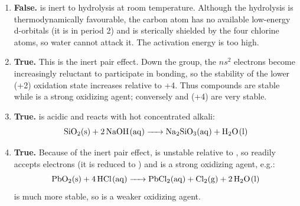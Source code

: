 \documentclass[11pt]{article}
\newcommand{\cle}[1]{{\popxbold\color{popdark}#1}}
\begin{document}
\begin{corrige}
\begin{enumerate}
\item \textbf{False.}  is inert to hydrolysis at room temperature. Although the hydrolysis is thermodynamically favourable, the carbon atom has no available low-energy d-orbitals (it is in period 2) and is sterically shielded by the four chlorine atoms, so water cannot attack it. The activation energy is too high.

\item \textbf{True.} This is the \cle{inert pair effect}. Down the group, the $ns^2$ electrons become increasingly reluctant to participate in bonding, so the stability of the lower (+2) oxidation state increases relative to +4. Thus  compounds are stable while  is a strong oxidizing agent; conversely  and  (+4) are very stable.

\item \textbf{True.}  is acidic and reacts with hot concentrated alkali:
\[
\ce{SiO2(s) + 2NaOH(aq) -> Na2SiO3(aq) + H2O(l)}
\]

\item \textbf{True.} Because of the inert pair effect,  is unstable relative to , so  readily accepts electrons (it is reduced to ) and is a strong oxidizing agent, e.g.:
\[
\ce{PbO2(s) + 4HCl(aq) -> PbCl2(aq) + Cl2(g) + 2H2O(l)}
\]
 is much more stable, so  is a weaker oxidizing agent.
\end{enumerate}
\end{corrige}
\end{document}
